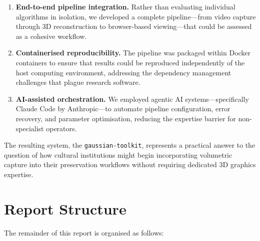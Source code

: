 \begin{enumerate}
  \item \textbf{End-to-end pipeline integration.} Rather than evaluating individual algorithms in isolation, we developed a complete pipeline---from video capture through 3D reconstruction to browser-based viewing---that could be assessed as a cohesive workflow.

  \item \textbf{Containerised reproducibility.} The pipeline was packaged within Docker containers to ensure that results could be reproduced independently of the host computing environment, addressing the dependency management challenges that plague research software.

  \item \textbf{AI-assisted orchestration.} We employed agentic AI systems---specifically Claude Code by Anthropic---to automate pipeline configuration, error recovery, and parameter optimisation, reducing the expertise barrier for non-specialist operators.
\end{enumerate}

The resulting system, the \texttt{gaussian-toolkit}, represents a practical answer to the question of how cultural institutions might begin incorporating volumetric capture into their preservation workflows without requiring dedicated 3D graphics expertise.

\section{Report Structure}
\label{sec:intro-structure}

The remainder of this report is organised as follows:

